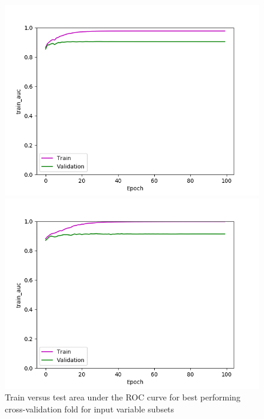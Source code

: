 \def\year{2017}\relax \documentclass[letterpaper]{article}
\begin{document}
\begin{figure}
\begin{minipage}{.24\textwidth}
  \centering
\includegraphics[width=\textwidth]{pics/d3_train_auc_best_train_test.png}
\caption{$D_3$}\label{fig:d3acctraintest}
\end{minipage}
\begin{minipage}{.01\textwidth}
\end{minipage}
\begin{minipage}{.24\textwidth}
  \centering
\includegraphics[width=\textwidth]{pics/d4_train_auc_best_train_test.png}
\caption{$D_4$}\label{fig:d4acctraintest}
\end{minipage}
\caption{Train versus test area under the ROC curve for best performing cross-validation fold for input variable subsets}\label{fig:traintestauc}
\end{figure}
\end{document}
